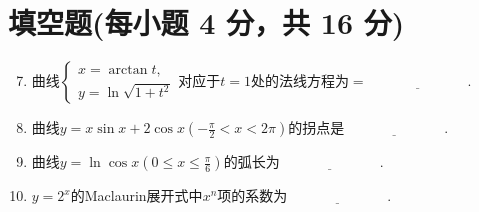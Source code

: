 \documentclass[../Main.tex]{subfiles}
\begin{document}
\section{填空题(每小题 4 分，共 16 分)}
\begin{enumerate}
    \setcounter{enumi}{6}
    \item 曲线$\begin{cases}
                  x = \arctan t, \\
                  y=\ln\sqrt{1+t^{2}}
              \end{cases}$对应于$t=1$处的法线方程为$=\underline{\hspace{3cm}}$.
          \vspace{0.5em}

    \item 曲线$y=x\sin x+2\cos x\left(-\frac{\pi}{2}<x<2\pi\right)$的拐点是$\underline
              {\hspace{3cm}}$.
          \vspace{0.5em}

    \item 曲线$y=\ln\cos x\left(0\leq x\leq\frac{\pi}{6}\right)$的弧长为$\underline
              {\hspace{3cm}}$.
          \vspace{0.5em}

    \item $y=2^{x}$的Maclaurin展开式中$x^{n}$项的系数为$\underline{\hspace{3cm}
              }$.
\end{enumerate}
\end{document}
